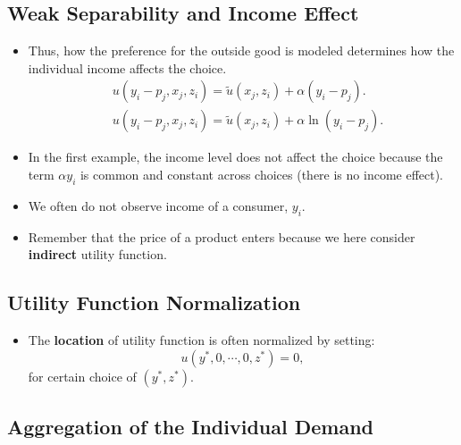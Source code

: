 \documentclass[
]{book}
\providecommand{\tightlist}{%
  \setlength{\itemsep}{0pt}\setlength{\parskip}{0pt}}
\begin{document}
\hypertarget{weak-separability-and-income-effect-1}{%
\subsection{Weak Separability and Income Effect}\label{weak-separability-and-income-effect-1}}

\begin{itemize}
\tightlist
\item
  Thus, how the preference for the outside good is modeled determines how the individual income affects the choice.
  \begin{equation}
  \begin{split}
  &u(y_i - p_j, x_j, z_i) = \tilde{u}(x_j, z_i) + \alpha(y_i - p_j).\\
  &u(y_i - p_j, x_j, z_i) = \tilde{u}(x_j, z_i) + \alpha \ln (y_i - p_j).
  \end{split}
  \end{equation}
\item
  In the first example, the income level does not affect the choice because the term \(\alpha y_i\) is common and constant across choices (there is no income effect).
\item
  We often do not observe income of a consumer, \(y_i\).
\item
  Remember that the price of a product enters because we here consider \textbf{indirect} utility function.
\end{itemize}

\hypertarget{utility-function-normalization}{%
\subsection{Utility Function Normalization}\label{utility-function-normalization}}

\begin{itemize}
\tightlist
\item
  The \textbf{location} of utility function is often normalized by setting:
  \begin{equation}
  u(y^*, 0, \cdots, 0, z^*) = 0,
  \end{equation}
  for certain choice of \((y^*, z^*)\).
\end{itemize}

\hypertarget{aggregation-of-the-individual-demand}{%
\subsection{Aggregation of the Individual Demand}\label{aggregation-of-the-individual-demand}}
\end{document}
